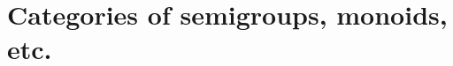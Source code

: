 
\section[Categories of semigroups, monoids, etc.]{Categories of semigroups, monoids, etc.}
\label{sec:cats-of-semigroups-monoids-etc}


